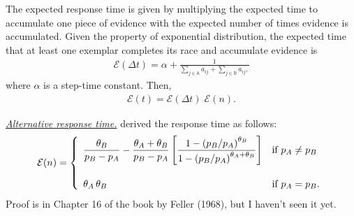 \documentclass[doc]{apa6}
\newcommand{\subsubsubsection}[1]{\textit{\underline{#1}}}
\begin{document}
The expected response time is given by multiplying the expected time to accumulate one piece of
evidence with the expected number of times evidence is accumulated.  Given the property of
exponential distribution, the expected time that at least one exemplar completes its race and
accumulate evidence is
\begin{align}
    \mathcal{E}(\Delta t) = \alpha +
                            \frac{1}
                                {\sum_{j \in \mathbb{A}} a_{ij} + \sum_{j \in \mathbb{B}} a_{ij},}
\end{align}
where $\alpha$ is a step-time constant. Then,
\begin{align}
    \mathcal{E}(t) = \mathcal{E}(\Delta t) \; \mathcal{E}(n).
\end{align}

\subsubsubsection{Alternative response time.} \textcite{Nosofsky1997a} derived the response time
as follows:
\begin{align}
    \mathcal{E}(n) = \left\{
        \begin{array}{ll}
            \displaystyle
                \frac{\theta_{B}}{p_{B} - p_{A}} - \frac{\theta_{A} + \theta_{B}}{p_{B} - p_{A}}
                \left[
                \frac{1 - {\left(p_{B}/p_{A}\right)}^{\theta_{B}}}
                     {1 - {\left(p_{B}/p_{A}\right)}^{\theta_{A} + \theta_{B}}}
                \right] & \mbox{if } p_{A} \neq p_{B} \\
            \vspace{2pt}\\
            \displaystyle
                \theta_{A} \, \theta_{B}
                    & \mbox{if } p_{A} = p_{B}.
        \end{array}
    \right.
\end{align}
Proof is in Chapter 16 of the book by Feller (1968), but I haven't seen it yet.
\end{document}
